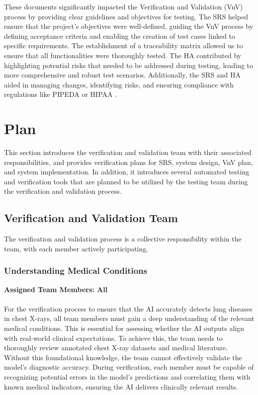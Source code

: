 \documentclass[12pt, titlepage]{article}
\begin{document}
\noindent These documents significantly impacted the Verification and Validation (VnV) process by providing clear guidelines and objectives for testing. The SRS helped ensure that the project’s objectives were well-defined, guiding the VnV process by defining acceptance criteria and enabling the creation of test cases linked to specific requirements. The establishment of a traceability matrix allowed us to ensure that all functionalities were thoroughly tested. The HA contributed by highlighting potential risks that needed to be addressed during testing, leading to more comprehensive and robust test scenarios. Additionally, the SRS and HA aided in managing changes, identifying risks, and ensuring compliance with regulations like PIPEDA or HIPAA \citep{HIPAA}.

\section{Plan}

This section introduces the verification and validation team with their associated
 responsibilities, and provides verification plans for SRS, system design, VnV plan,
 and system implementation. In addition, it introduces several automated testing
 and verification tools that are planned to be utilized by the testing team during the
 verification and validation process.
\subsection{Verification and Validation Team}

The verification and validation process is a collective responsibility within the team,
with each member actively participating.

\subsubsection{Understanding Medical Conditions}
\textbf{Assigned Team Members: All} \\\\
For the verification process to ensure that the AI accurately detects lung diseases in chest X-rays, all team members must gain a deep understanding of the relevant medical conditions. This is essential for assessing whether the AI outputs align with real-world clinical expectations. To achieve this, the team needs to thoroughly review annotated chest X-ray datasets and medical literature. Without this foundational knowledge, the team cannot effectively validate the model’s diagnostic accuracy. During verification, each member must be capable of recognizing potential errors in the model’s predictions and correlating them with known medical indicators, ensuring the AI delivers clinically relevant results.
\end{document}
